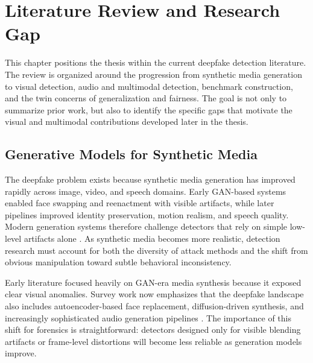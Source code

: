 \chapter{Literature Review and Research Gap}
\label{chap:literature}

This chapter positions the thesis within the current deepfake detection literature. The review is organized around the progression from synthetic media generation to visual detection, audio and multimodal detection, benchmark construction, and the twin concerns of generalization and fairness. The goal is not only to summarize prior work, but also to identify the specific gaps that motivate the visual and multimodal contributions developed later in the thesis.

\section{Generative Models for Synthetic Media}

The deepfake problem exists because synthetic media generation has improved rapidly across image, video, and speech domains. Early GAN-based systems enabled face swapping and reenactment with visible artifacts, while later pipelines improved identity preservation, motion realism, and speech quality. Modern generation systems therefore challenge detectors that rely on simple low-level artifacts alone \cite{kaur2024deepfake,gong2024survey,dissanayake2025review}. As synthetic media becomes more realistic, detection research must account for both the diversity of attack methods and the shift from obvious manipulation toward subtle behavioral inconsistency.

Early literature focused heavily on GAN-era media synthesis because it exposed clear visual anomalies. Survey work now emphasizes that the deepfake landscape also includes autoencoder-based face replacement, diffusion-driven synthesis, and increasingly sophisticated audio generation pipelines \cite{mubarak2023survey,gong2024survey}. The importance of this shift for forensics is straightforward: detectors designed only for visible blending artifacts or frame-level distortions will become less reliable as generation models improve.

